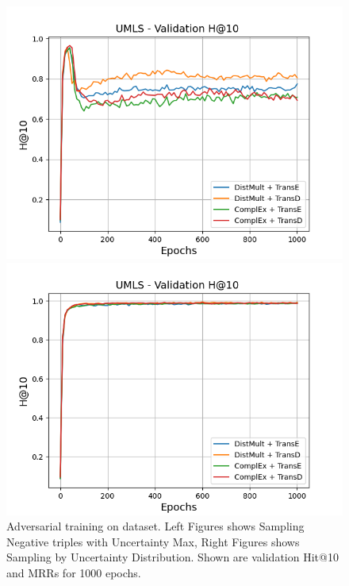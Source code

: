 \begin{figure}[H]
    \begin{minipage}{.5\textwidth}
      \centering
      \includegraphics[width=0.9\linewidth]{figures/results/gan_train/not_pretrained/uncertainty/max/entropy/umls/1k_epochs/uncertainty_umls_hit10.png}
    \end{minipage}%
    \begin{minipage}{.5\textwidth}
      \centering
      \includegraphics[width=0.9\linewidth]{figures/results/gan_train/not_pretrained/uncertainty/max_distribution/entropy/umls/1k_epochs/uncertainty_umls_hit10.png}
    \end{minipage}%
    \caption{Adversarial training on \umls dataset. 
    Left Figures shows Sampling Negative triples with Uncertainty Max, Right Figures shows Sampling by Uncertainty Distribution.
    Shown are validation Hit@10 and MRRs for 1000 epochs.}
    \label{fig:advtrain_umls_usmax_ussoftmax}
\end{figure}
